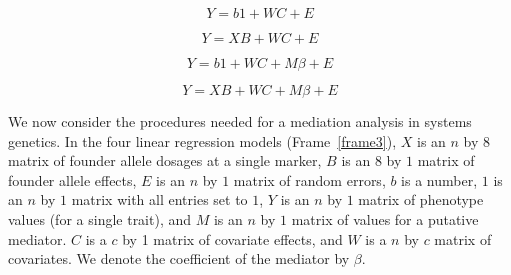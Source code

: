 \documentclass[oneside]{book}\usepackage[]{graphicx}\usepackage[]{color}
\newenvironment{frameenv}[1]
    {\begin{myfloat}[tb]
    \begin{mdframed}[roundcorner=10pt,backgroundcolor=blue!10]
    \caption{#1}
    }
    {%
    \end{mdframed}\end{myfloat}
    }
\begin{document}


\begin{frameenv}{Four regressions for a single mediation analysis}\label{frame3}


\begin{equation}
Y = b1 + WC + E
\label{model1}
\end{equation}

\begin{equation}
Y = XB + WC + E
\label{model2}
\end{equation}

\begin{equation}
Y = b1 + WC + M\beta + E
\label{model3}
\end{equation}

\begin{equation}
Y = XB + WC + M\beta + E
\label{model4}
\end{equation}
\end{frameenv}

We now consider the procedures needed for a mediation analysis in systems genetics.
In the four linear regression models (Frame~\ref{frame3}), $X$ is an $n$ by $8$ matrix of 
founder allele dosages at a single marker, $B$ is an $8$ by $1$ matrix of founder allele 
effects, $E$ is an $n$ by $1$ matrix of random errors, $b$ 
is a number, $1$ is 
an $n$ by $1$ matrix with all entries set to $1$, $Y$ is 
an $n$ by $1$ matrix of 
phenotype values (for a single trait), and $M$ is an $n$ 
by $1$ matrix of values for a putative mediator. 
$C$ is a $c$ by 1 matrix of covariate effects, and $W$ is 
a $n$ by $c$ matrix of covariates. 
We denote the coefficient of the mediator by $\beta$.
\end{document}
